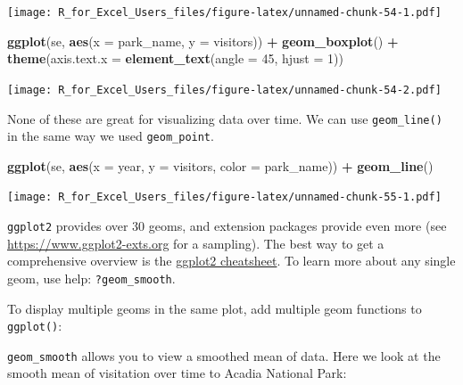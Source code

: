 \documentclass[]{book}
\newenvironment{Shaded}{\begin{snugshade}}{\end{snugshade}}
\newcommand{\DataTypeTok}[1]{\textcolor[rgb]{0.13,0.29,0.53}{#1}}
\newcommand{\DecValTok}[1]{\textcolor[rgb]{0.00,0.00,0.81}{#1}}
\newcommand{\KeywordTok}[1]{\textcolor[rgb]{0.13,0.29,0.53}{\textbf{#1}}}
\newcommand{\NormalTok}[1]{#1}
\newcommand{\OperatorTok}[1]{\textcolor[rgb]{0.81,0.36,0.00}{\textbf{#1}}}
\newcommand{\StringTok}[1]{\textcolor[rgb]{0.31,0.60,0.02}{#1}}
\begin{document}
\texttt{[image: R\_for\_Excel\_Users\_files/figure-latex/unnamed-chunk-54-1.pdf]}

\begin{Shaded}
\begin{Highlighting}[]
\KeywordTok{ggplot}\NormalTok{(se, }\KeywordTok{aes}\NormalTok{(}\DataTypeTok{x =}\NormalTok{ park_name, }\DataTypeTok{y =}\NormalTok{ visitors)) }\OperatorTok{+}\StringTok{ }
\StringTok{  }\KeywordTok{geom_boxplot}\NormalTok{() }\OperatorTok{+}
\StringTok{  }\KeywordTok{theme}\NormalTok{(}\DataTypeTok{axis.text.x =} \KeywordTok{element_text}\NormalTok{(}\DataTypeTok{angle =} \DecValTok{45}\NormalTok{, }\DataTypeTok{hjust =} \DecValTok{1}\NormalTok{))}
\end{Highlighting}
\end{Shaded}

\texttt{[image: R\_for\_Excel\_Users\_files/figure-latex/unnamed-chunk-54-2.pdf]}

None of these are great for visualizing data over time. We can use \texttt{geom\_line()} in the same way we used \texttt{geom\_point}.

\begin{Shaded}
\begin{Highlighting}[]
\KeywordTok{ggplot}\NormalTok{(se, }\KeywordTok{aes}\NormalTok{(}\DataTypeTok{x =}\NormalTok{ year, }\DataTypeTok{y =}\NormalTok{ visitors, }\DataTypeTok{color =}\NormalTok{ park_name)) }\OperatorTok{+}
\StringTok{   }\KeywordTok{geom_line}\NormalTok{()}
\end{Highlighting}
\end{Shaded}

\texttt{[image: R\_for\_Excel\_Users\_files/figure-latex/unnamed-chunk-55-1.pdf]}

\texttt{ggplot2} provides over 30 geoms, and extension packages provide even more (see \url{https://www.ggplot2-exts.org} for a sampling). The best way to get a comprehensive overview is the \href{http://rstudio.com/cheatsheets}{ggplot2 cheatsheet}. To learn more about any single geom, use help: \texttt{?geom\_smooth}.

To display multiple geoms in the same plot, add multiple geom functions to \texttt{ggplot()}:

\texttt{geom\_smooth} allows you to view a smoothed mean of data. Here we look at the smooth mean of visitation over time to Acadia National Park:
\end{document}
